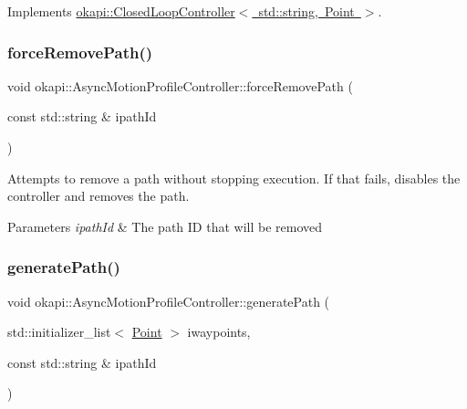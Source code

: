 Implements \mbox{\hyperlink{classokapi_1_1ClosedLoopController_a768cd1db40ce9cd5c89b20be6e838ccc}{okapi\+::\+Closed\+Loop\+Controller$<$ std\+::string, Point $>$}}.

\mbox{\label{classokapi_1_1AsyncMotionProfileController_ace5f9053d3455e6f5e69c63f1196521e}} 
\subsubsection{\texorpdfstring{forceRemovePath()}{forceRemovePath()}}
{\footnotesize\ttfamily void okapi\+::\+Async\+Motion\+Profile\+Controller\+::force\+Remove\+Path (\begin{DoxyParamCaption}\item[{const std\+::string \&}]{ipath\+Id }\end{DoxyParamCaption})}

Attempts to remove a path without stopping execution. If that fails, disables the controller and removes the path.


\begin{DoxyParams}{Parameters}
{\em ipath\+Id} & The path ID that will be removed \\
\hline
\end{DoxyParams}
\mbox{\label{classokapi_1_1AsyncMotionProfileController_a767919702ab379bac5273010baf03cda}} 
\subsubsection{\texorpdfstring{generatePath()}{generatePath()}\hspace{0.1cm}{\footnotesize\ttfamily [1/2]}}
{\footnotesize\ttfamily void okapi\+::\+Async\+Motion\+Profile\+Controller\+::generate\+Path (\begin{DoxyParamCaption}\item[{std\+::initializer\+\_\+list$<$ \mbox{\hyperlink{structokapi_1_1Point}{Point}} $>$}]{iwaypoints,  }\item[{const std\+::string \&}]{ipath\+Id }\end{DoxyParamCaption})}

